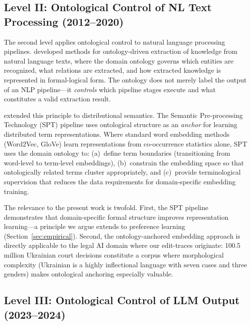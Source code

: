 \documentclass[11pt]{article}
\begin{document}
\subsection{Level II: Ontological Control of NL Text Processing (2012--2020)}
\label{sec:level2}

The second level applies ontological control to natural language processing pipelines.
\citet{palagin2012knowledge} developed methods for ontology-driven extraction of knowledge from natural language texts, where the domain ontology governs which entities are recognized, what relations are extracted, and how extracted knowledge is represented in formal-logical form.
The ontology does not merely label the output of an NLP pipeline---it \emph{controls} which pipeline stages execute and what constitutes a valid extraction result.

\citet{palagin2020distributional} extended this principle to distributional semantics.
The Semantic Pre-processing Technology (SPT) pipeline uses ontological structure as an \emph{anchor} for learning distributed term representations.
Where standard word embedding methods (Word2Vec, GloVe) learn representations from co-occurrence statistics alone, SPT uses the domain ontology to:
(a)~define term boundaries (transitioning from word-level to term-level embeddings),
(b)~constrain the embedding space so that ontologically related terms cluster appropriately, and
(c)~provide terminological supervision that reduces the data requirements for domain-specific embedding training.

The relevance to the present work is twofold.
First, the SPT pipeline demonstrates that domain-specific formal structure improves representation learning---a principle we argue extends to preference learning (Section~\ref{sec:empirical}).
Second, the ontology-anchored embedding approach is directly applicable to the legal AI domain where our edit-traces originate: 100.5 million Ukrainian court decisions constitute a corpus where morphological complexity (Ukrainian is a highly inflectional language with seven cases and three genders) makes ontological anchoring especially valuable.

\subsection{Level III: Ontological Control of LLM Output (2023--2024)}
\label{sec:level3}
\end{document}
